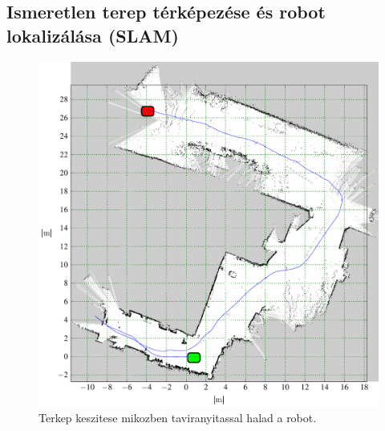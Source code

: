 \renewcommand{\GlobalPath}{Meresek/Mozgasok/GyergyoFuvesUdvar/M1/}
\renewcommand{\plotRotSpeed}{o}
\renewcommand{\plotSpeed}{o}
%

\renewcommand{\GlobalPath}{Meresek/Mozgasok/M6/}
%

\renewcommand{\GlobalPath}{Meresek/Mozgasok/SzobaElore/}
%

\renewcommand{\GlobalPath}{Meresek/Mozgasok/SzobaBalraDiff/}
%

%






\newpage

\subsection{Ismeretlen terep térképezése és robot lokalizálása (SLAM)}


\begin{figure}[H]
  \label{fig:hatsoudvarmap}
  \includegraphics{tikz/hatsoudvarmap.pdf}
  \caption{Terkep keszitese mikozben taviranyitassal halad a robot.}
\end{figure}




